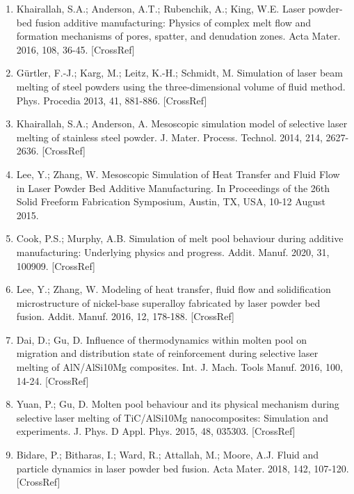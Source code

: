 \documentclass[10pt]{article}
\begin{document}
\begin{enumerate}
  \item Khairallah, S.A.; Anderson, A.T.; Rubenchik, A.; King, W.E. Laser powder-bed fusion additive manufacturing: Physics of complex melt flow and formation mechanisms of pores, spatter, and denudation zones. Acta Mater. 2016, 108, 36-45. [CrossRef]

  \item Gürtler, F.-J.; Karg, M.; Leitz, K.-H.; Schmidt, M. Simulation of laser beam melting of steel powders using the three-dimensional volume of fluid method. Phys. Procedia 2013, 41, 881-886. [CrossRef]

  \item Khairallah, S.A.; Anderson, A. Mesoscopic simulation model of selective laser melting of stainless steel powder. J. Mater. Process. Technol. 2014, 214, 2627-2636. [CrossRef]

  \item Lee, Y.; Zhang, W. Mesoscopic Simulation of Heat Transfer and Fluid Flow in Laser Powder Bed Additive Manufacturing. In Proceedings of the 26th Solid Freeform Fabrication Symposium, Austin, TX, USA, 10-12 August 2015.

  \item Cook, P.S.; Murphy, A.B. Simulation of melt pool behaviour during additive manufacturing: Underlying physics and progress. Addit. Manuf. 2020, 31, 100909. [CrossRef]

  \item Lee, Y.; Zhang, W. Modeling of heat transfer, fluid flow and solidification microstructure of nickel-base superalloy fabricated by laser powder bed fusion. Addit. Manuf. 2016, 12, 178-188. [CrossRef]

  \item Dai, D.; Gu, D. Influence of thermodynamics within molten pool on migration and distribution state of reinforcement during selective laser melting of AlN/AlSi10Mg composites. Int. J. Mach. Tools Manuf. 2016, 100, 14-24. [CrossRef]

  \item Yuan, P.; Gu, D. Molten pool behaviour and its physical mechanism during selective laser melting of TiC/AlSi10Mg nanocomposites: Simulation and experiments. J. Phys. D Appl. Phys. 2015, 48, 035303. [CrossRef]

  \item Bidare, P.; Bitharas, I.; Ward, R.; Attallah, M.; Moore, A.J. Fluid and particle dynamics in laser powder bed fusion. Acta Mater. 2018, 142, 107-120. [CrossRef]


\end{enumerate}
\end{document}
